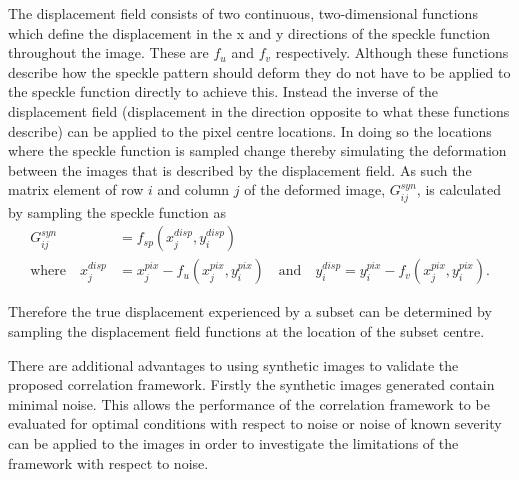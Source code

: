 \documentclass[12pt,oneside,openany,a4paper, %
english, %
masters-t, goldenblock]{usthesis}
\begin{document}
The displacement field consists of two continuous, two-dimensional functions which define the displacement in the x and y directions of the speckle function throughout the image. These are $f_u$ and $f_v$ respectively. Although these functions describe how the speckle pattern should deform they do not have to be applied to the speckle function directly to achieve this. Instead the inverse of the displacement field (displacement in the direction opposite to what these functions describe) can be applied to the pixel centre locations. In doing so the locations where the speckle function is sampled change thereby simulating the deformation between the images that is described by the displacement field. As such the matrix element of row $i$ and column $j$ of the deformed image, $G_{ij}^{syn}$, is calculated by sampling the speckle function as
\begin{align}
\label{eq: deformed synthetic image}
  G_{ij}^{syn} &= f_{sp}\left(x_j^{disp},y_i^{disp} \right) \\
  \text{where} \quad x_j^{disp}&= x_j^{pix} - f_{u}(x_j^{pix},y_i^{pix}) \quad \text{and} \quad y_i^{disp}= y_i^{pix}-f_{v}(x_j^{pix},y_i^{pix}).\label{eq: displaced locations}
\end{align}

Therefore the true displacement experienced by a subset can be determined by sampling the displacement field functions at the location of the subset centre.



There are additional advantages to using synthetic images to validate the proposed correlation framework. Firstly the synthetic images generated contain minimal noise. This allows the performance of the correlation framework to be evaluated for optimal conditions with respect to noise or noise of known severity can be applied to the images in order to investigate the limitations of the framework with respect to noise.
\end{document}
